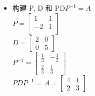 \documentclass[12pt]{article}
\begin{document}
\begin{flushleft}
\begin{itemize}
\begin{align}
              \end{align}
              $x = y $ \\
              $\vec{v_{2}} = \begin{bmatrix}
                      1 \\
                      1
                  \end{bmatrix}$
        \item 构建 P, D 和 PD$P^{-1} = A$ \\
              $P = \begin{bmatrix}
                      1  & 1 \\
                      -2 & 1 \\
                  \end{bmatrix}$ \\
              $D = \begin{bmatrix}
                      2 & 0 \\
                      0 & 5
                  \end{bmatrix}$ \\
              $P^{-1} = \begin{bmatrix}
                      \frac{1}{3} & -\frac{1}{3} \\
                      \frac{2}{3} & \frac{1}{3}
                  \end{bmatrix}$ \\
              $PDP^{-1}$ = $A = \begin{bmatrix}
                      4 & 1 \\
                      2 & 3
                  \end{bmatrix}$
    \end{itemize}
\end{flushleft}
\end{document}
